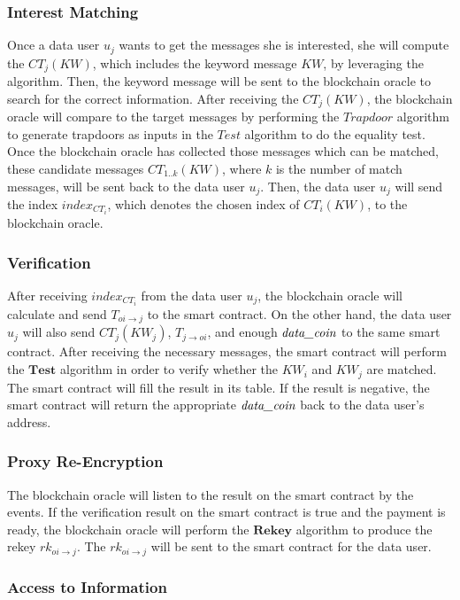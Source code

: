 \documentclass[journal,10pt]{IEEEtran}
\begin{document}
\subsubsection{\textbf{Interest Matching}}
Once a data user $u_j$ wants to get the messages she is interested, she will compute the $CT_j(KW)$, which includes the keyword message $KW$, by leveraging the  algorithm. Then, the keyword message will be sent to the blockchain oracle to search for the correct information. After receiving the $CT_j(KW)$, the blockchain oracle will compare to the target messages by performing the $Trapdoor$ algorithm to generate trapdoors as inputs in the $Test$ algorithm to do the equality test. Once the blockchain oracle has collected those messages which can be matched, these candidate messages $CT_{1..k}(KW)$, where $k$ is the number of match messages, will be sent back to the data user $u_j$. Then, the data user $u_j$ will send the index $index_{CT_i}$, which denotes the chosen index of $CT_i(KW)$, to the blockchain oracle.

\subsubsection{\textbf{Verification}}
After receiving $index_{CT_i}$ from the data user $u_j$, the blockchain oracle will calculate and send $T_{oi \to j}$ to the smart contract. On the other hand, the data user $u_j$ will also send $CT_j(KW_j)$, $T_{j \to oi}$, and enough $\emph{data\_coin}$ to the same smart contract. After receiving the necessary messages, the smart contract will perform the $\boldsymbol{Test}$ algorithm in order to verify whether the $KW_i$ and $KW_j$ are matched. The smart contract will fill the result in its table. If the result is negative, the smart contract will return the appropriate $\emph{data\_coin}$ back to the data user's address.

\subsubsection{\textbf{Proxy Re-Encryption}}
The blockchain oracle will listen to the result on the smart contract by the events. If the verification result on the smart contract is true and the payment is ready, the blockchain oracle will perform the $\boldsymbol{Rekey}$ algorithm to produce the rekey $rk_{oi \to j}$. The $rk_{oi \to j}$ will be sent to the smart contract for the data user.

\subsubsection{\textbf{Access to Information}}
\end{document}
